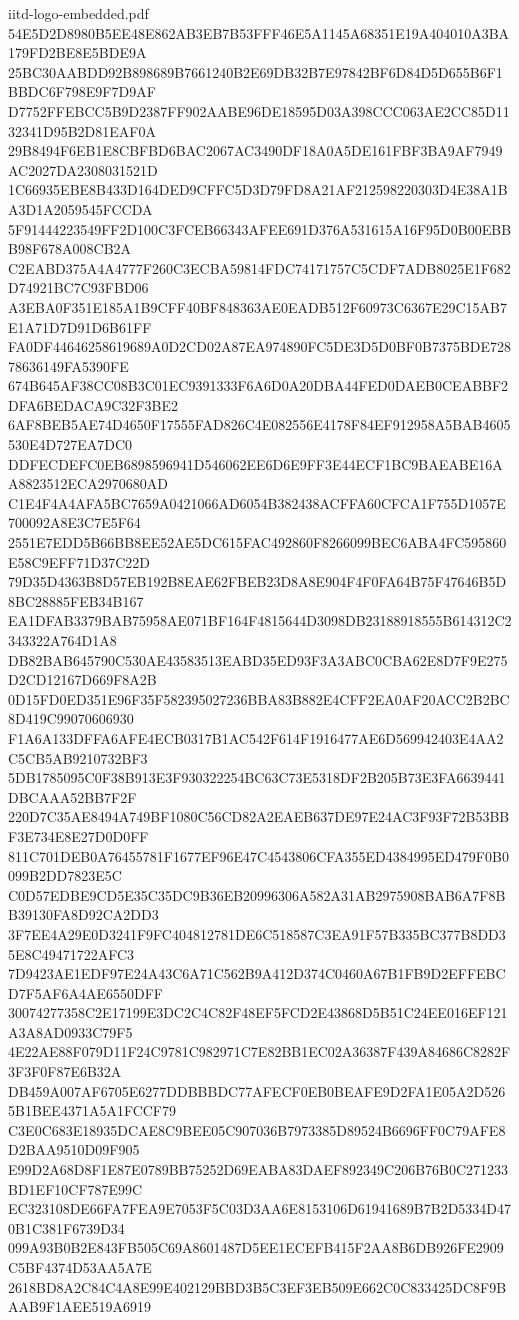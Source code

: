 \begin{filecontents*}[overwrite]{iitd-logo-embedded.pdf}
54E5D2D8980B5EE48E862AB3EB7B53FFF46E5A1145A68351E19A404010A3BA179FD2BE8E5BDE9A
25BC30AABDD92B898689B7661240B2E69DB32B7E97842BF6D84D5D655B6F1BBDC6F798E9F7D9AF
D7752FFEBCC5B9D2387FF902AABE96DE18595D03A398CCC063AE2CC85D1132341D95B2D81EAF0A
29B8494F6EB1E8CBFBD6BAC2067AC3490DF18A0A5DE161FBF3BA9AF7949AC2027DA2308031521D
1C66935EBE8B433D164DED9CFFC5D3D79FD8A21AF212598220303D4E38A1BA3D1A2059545FCCDA
5F91444223549FF2D100C3FCEB66343AFEE691D376A531615A16F95D0B00EBBB98F678A008CB2A
C2EABD375A4A4777F260C3ECBA59814FDC74171757C5CDF7ADB8025E1F682D74921BC7C93FBD06
A3EBA0F351E185A1B9CFF40BF848363AE0EADB512F60973C6367E29C15AB7E1A71D7D91D6B61FF
FA0DF44646258619689A0D2CD02A87EA974890FC5DE3D5D0BF0B7375BDE72878636149FA5390FE
674B645AF38CC08B3C01EC9391333F6A6D0A20DBA44FED0DAEB0CEABBF2DFA6BEDACA9C32F3BE2
6AF8BEB5AE74D4650F17555FAD826C4E082556E4178F84EF912958A5BAB4605530E4D727EA7DC0
DDFECDEFC0EB6898596941D546062EE6D6E9FF3E44ECF1BC9BAEABE16AA8823512ECA2970680AD
C1E4F4A4AFA5BC7659A0421066AD6054B382438ACFFA60CFCA1F755D1057E700092A8E3C7E5F64
2551E7EDD5B66BB8EE52AE5DC615FAC492860F8266099BEC6ABA4FC595860E58C9EFF71D37C22D
79D35D4363B8D57EB192B8EAE62FBEB23D8A8E904F4F0FA64B75F47646B5D8BC28885FEB34B167
EA1DFAB3379BAB75958AE071BF164F4815644D3098DB23188918555B614312C2343322A764D1A8
DB82BAB645790C530AE43583513EABD35ED93F3A3ABC0CBA62E8D7F9E275D2CD12167D669F8A2B
0D15FD0ED351E96F35F582395027236BBA83B882E4CFF2EA0AF20ACC2B2BC8D419C99070606930
F1A6A133DFFA6AFE4ECB0317B1AC542F614F1916477AE6D569942403E4AA2C5CB5AB9210732BF3
5DB1785095C0F38B913E3F930322254BC63C73E5318DF2B205B73E3FA6639441DBCAAA52BB7F2F
220D7C35AE8494A749BF1080C56CD82A2EAEB637DE97E24AC3F93F72B53BBF3E734E8E27D0D0FF
811C701DEB0A76455781F1677EF96E47C4543806CFA355ED4384995ED479F0B0099B2DD7823E5C
C0D57EDBE9CD5E35C35DC9B36EB20996306A582A31AB2975908BAB6A7F8BB39130FA8D92CA2DD3
3F7EE4A29E0D3241F9FC404812781DE6C518587C3EA91F57B335BC377B8DD35E8C49471722AFC3
7D9423AE1EDF97E24A43C6A71C562B9A412D374C0460A67B1FB9D2EFFEBCD7F5AF6A4AE6550DFF
30074277358C2E17199E3DC2C4C82F48EF5FCD2E43868D5B51C24EE016EF121A3A8AD0933C79F5
4E22AE88F079D11F24C9781C982971C7E82BB1EC02A36387F439A84686C8282F3F3F0F87E6B32A
DB459A007AF6705E6277DDBBBDC77AFECF0EB0BEAFE9D2FA1E05A2D5265B1BEE4371A5A1FCCF79
C3E0C683E18935DCAE8C9BEE05C907036B7973385D89524B6696FF0C79AFE8D2BAA9510D09F905
E99D2A68D8F1E87E0789BB75252D69EABA83DAEF892349C206B76B0C271233BD1EF10CF787E99C
EC323108DE66FA7FEA9E7053F5C03D3AA6E8153106D61941689B7B2D5334D470B1C381F6739D34
099A93B0B2E843FB505C69A8601487D5EE1ECEFB415F2AA8B6DB926FE2909C5BF4374D53AA5A7E
2618BD8A2C84C4A8E99E402129BBD3B5C3EF3EB509E662C0C833425DC8F9BAAB9F1AEE519A6919

\end{filecontents*}
